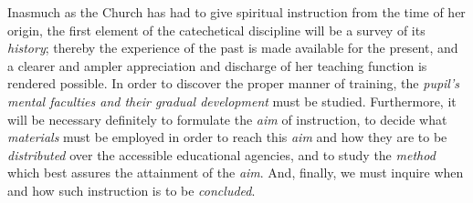Inasmuch as the Church has had to give spiritual instruction from the time of her origin, the first element of the catechetical discipline will be a survey of its \emph{history}; thereby the experience of the past is made available for the present, and a clearer and ampler appreciation and discharge of her teaching function is rendered possible. In order to discover the proper manner of training, the \emph{pupil’s mental faculties and their gradual development} must be studied. Furthermore, it will be necessary definitely to formulate the \emph{aim} of instruction, to decide what \emph{materials} must be employed in order to reach this \emph{aim} and how they are to be \emph{distributed} over the accessible educational agencies, and to study the \emph{method} which best assures the attainment of the \emph{aim}. And, finally, we must inquire when and how such instruction is to be \emph{concluded}.
